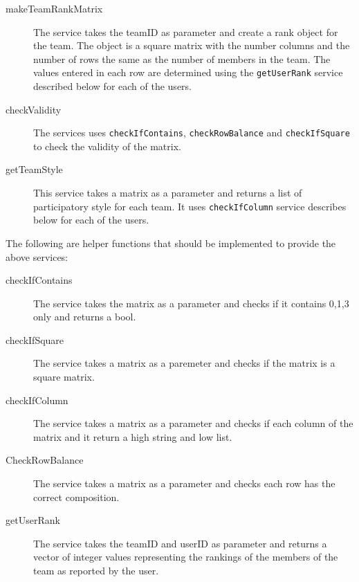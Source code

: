 \begin{description}

\item[makeTeamRankMatrix] The service takes the teamID as parameter and create a rank object for the team. The object is a square matrix with the number columns and the number of rows the same as the number of members in the team. The values entered in each row are determined using the \texttt{getUserRank} service described below for each of the users. 



\item[checkValidity] The services uses \texttt{checkIfContains}, \texttt{checkRowBalance} and \texttt{checkIfSquare} to check the validity of the matrix.



\item[getTeamStyle] This service takes a matrix as a parameter and returns a list of participatory style for each team. It uses \texttt{checkIfColumn} service describes below for each of the users.



 


\end{description}  
The following are helper functions that should be implemented to provide the above services:
\begin{description}
	
	\item[checkIfContains] The service takes the matrix as a parameter and checks if it contains 0,1,3 only and returns a bool.
	
	\item[checkIfSquare] The service takes a matrix as a paremeter and checks if the matrix is a square matrix.
	
	\item[checkIfColumn] The service takes a matrix as a parameter and checks if each column of the matrix and it return a high string and low list.
	
	\item[CheckRowBalance] The service takes a matrix as a parameter and checks each row has the correct composition.
	
	\item[getUserRank] The service takes the teamID and userID as parameter and returns a vector of integer values representing the rankings of the members of the team as reported by the user. 
	
	
	
\end{description}









